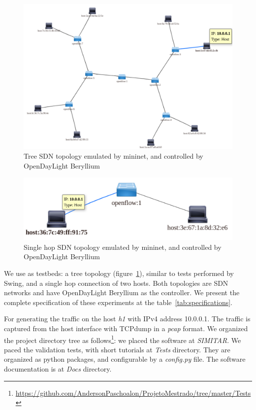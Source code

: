 \begin{figure}[!ht]
	\centering
	\includegraphics[scale=0.4]{figures/ch5/topo-tree}
	\caption{Tree SDN topology emulated by mininet, and controlled by OpenDayLight Beryllium}
	\label{fig:topo-tree}
\end{figure}

\begin{figure}[!ht]
	\centering
	\includegraphics[scale=0.4]{figures/ch5/topo-simple}
	\caption{Single hop SDN topology emulated by mininet, and controlled by OpenDayLight Beryllium}
	\label{fig:topo-simple}
\end{figure}

We use as testbeds: a tree topology (figure~\ref{fig:topo-tree}), similar to tests performed by Swing\cite{swing-paper}\cite{background-traffic-matter}\cite{legotg-paper}, and a single hop connection of two hosts. Both topologies are SDN networks and have OpenDayLight Beryllium as the controller.  We present the complete specification of these experiments at the table~\ref{tab:specifications}.

For generating the traffic on the host \textit{h1} with IPv4 address 10.0.0.1. The traffic is captured from the host interface with TCPdump in a \textit{pcap} format.  We organized the project directory tree as follows\footnote{ \href{https://github.com/AndersonPaschoalon/ProjetoMestrado/tree/master/Tests}{https://github.com/AndersonPaschoalon/ProjetoMestrado/tree/master/Tests} }: we placed the software at \textit{SIMITAR}. We paced the validation tests, with short tutorials at \textit{Tests} directory. They are organized as python packages, and configurable by a \textit{config.py} file. The software documentation is at \textit{Docs} directory. 

